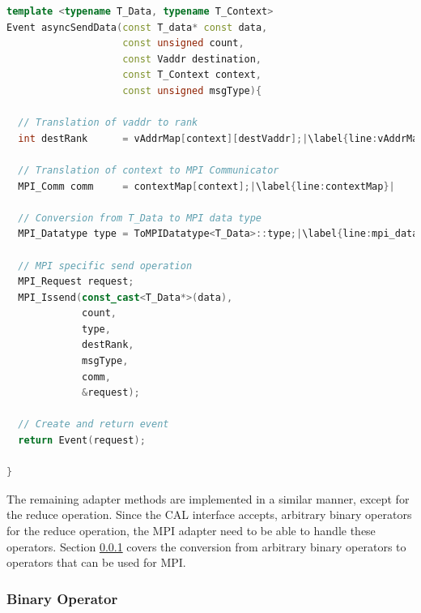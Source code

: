 \begin{lstlisting}[language=C++, breaklines=false, label={lst:adapter_send},escapechar=|]
template <typename T_Data, typename T_Context>      
Event asyncSendData(const T_data* const data, 
                    const unsigned count, 
                    const Vaddr destination, 
                    const T_Context context, 
                    const unsigned msgType){    

  // Translation of vaddr to rank
  int destRank      = vAddrMap[context][destVaddr];|\label{line:vAddrMap}|

  // Translation of context to MPI Communicator
  MPI_Comm comm     = contextMap[context];|\label{line:contextMap}|

  // Conversion from T_Data to MPI data type
  MPI_Datatype type = ToMPIDatatype<T_Data>::type;|\label{line:mpi_datatype}|

  // MPI specific send operation                                                                            
  MPI_Request request; 
  MPI_Issend(const_cast<T_Data*>(data), 
             count, 
             type,
             destRank, 
             msgType,
             comm,
             &request);

  // Create and return event
  return Event(request);                                                                                                       

}  
\end{lstlisting}

\noindent The remaining adapter methods are implemented in a similar manner,
except for the reduce operation. Since the CAL interface accepts,
arbitrary binary operators for the reduce operation, the MPI adapter
need to be able to handle these operators. Section
\ref{sec:bin_operator} covers the conversion from arbitrary binary
operators to operators that can be used for MPI.

\subsubsection{Binary Operator}
\label{sec:bin_operator}

